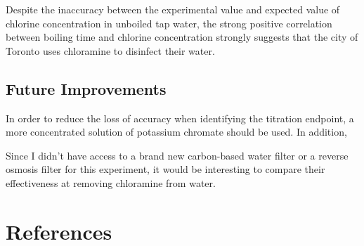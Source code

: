 \documentclass[11pt]{article}
\begin{document}
Despite the inaccuracy between the experimental value and expected value of chlorine concentration in unboiled tap water, the strong positive correlation between boiling time and chlorine concentration strongly suggests that the city of Toronto uses chloramine to disinfect their water.

\subsection{Future Improvements}

In order to reduce the loss of accuracy when identifying the titration endpoint, a more concentrated solution of potassium chromate should be used. In addition,

Since I didn't have access to a brand new carbon-based water filter or a reverse osmosis filter for this experiment, it would be interesting to compare their effectiveness at removing chloramine from water.

\section{References}

\printbibliography
\end{document}
